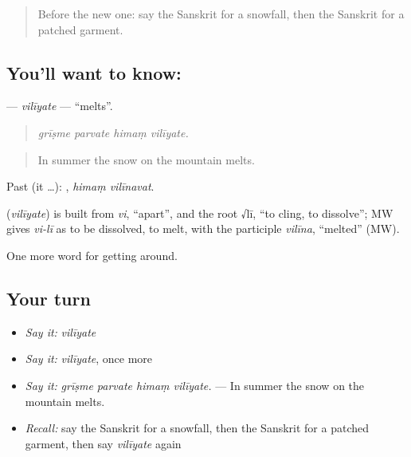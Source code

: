 \label{lesson:SA-C440-viliyate}



\begin{quote}
Before the new one: say the Sanskrit for a snowfall, then the Sanskrit for a patched garment.
\end{quote}

\subsection*{You'll want to know: }
\textbf{} — \emph{vilīyate} — \textquotedblleft{}melts\textquotedblright{}.

\begin{quote}
   
\end{quote}

\begin{quote}
\emph{grīṣme parvate himaṃ vilīyate.}
\end{quote}

\begin{quote}
In summer the snow on the mountain melts.
\end{quote}

Past (it …):  , \emph{himaṃ vilīnavat}.

\begin{cousinweb}
\textbf{} (\emph{vilīyate}) is built from \emph{vi}, \textquotedblleft{}apart\textquotedblright{}, and the root √lī, \textquotedblleft{}to cling, to dissolve\textquotedblright{}; MW gives \emph{vi-lī} as to be dissolved, to melt, with the participle \emph{vilīna}, \textquotedblleft{}melted\textquotedblright{} (MW).
\end{cousinweb}

\begin{grammarlens}[title={What you've built}]
One more word for getting around.
\end{grammarlens}

\subsection*{Your turn}
\begin{itemize}
\raggedright
  \item \emph{Say it:} \emph{vilīyate}
  \item \emph{Say it:} \emph{vilīyate}, once more
  \item \emph{Say it:} \emph{grīṣme parvate himaṃ vilīyate.} — In summer the snow on the mountain melts.
  \item \emph{Recall:} say the Sanskrit for a snowfall, then the Sanskrit for a patched garment, then say \emph{vilīyate} again
\end{itemize}

